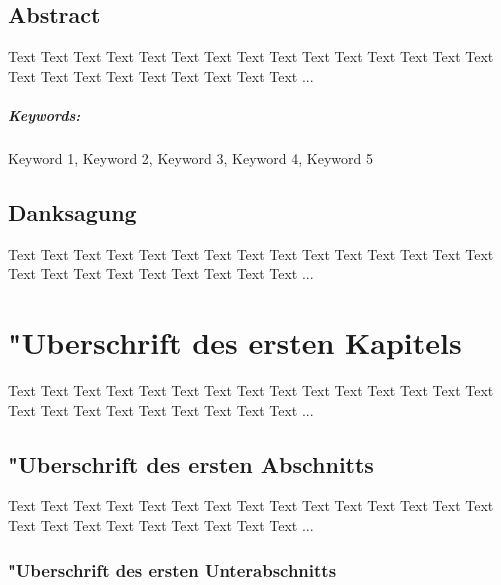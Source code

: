 \documentclass[a4paper,bibtotoc,oneside]{scrbook}
\begin{document}
\newpage

\section*{Abstract}\thispagestyle{empty}
Text Text Text Text Text Text Text Text Text Text Text Text Text Text Text Text Text Text Text Text Text Text Text Text ...
\\ \vfill
\paragraph*{Keywords:} Keyword 1, Keyword 2, Keyword 3, Keyword 4, Keyword 5
\newpage

\section*{Danksagung}\thispagestyle{empty}
Text Text Text Text Text Text Text Text Text Text Text Text Text Text Text Text Text Text Text Text Text Text Text Text ...
\newpage

\tableofcontents\thispagestyle{empty}
\newpage

\setcounter{page}{1}

\chapter[Erstes Kapitel]{"Uberschrift des ersten Kapitels}

Text Text Text Text Text Text Text Text Text Text Text Text Text Text Text Text Text Text Text Text Text Text Text Text ...

\section[Erster Abschnitt]{"Uberschrift des ersten Abschnitts}

Text Text Text Text Text Text Text Text Text Text Text Text Text Text Text Text Text Text Text Text Text Text Text Text ...

\subsection[Erster Unterabschnitt]{"Uberschrift des ersten Unterabschnitts}
\end{document}
